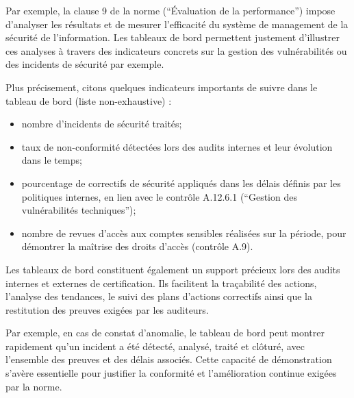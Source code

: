 Par exemple, la clause 9 de la norme (“Évaluation de la performance”) impose d'analyser les résultats et de mesurer l'efficacité du système de management de la sécurité de l'information. Les tableaux de bord permettent justement d’illustrer ces analyses à travers des indicateurs concrets sur la gestion des vulnérabilités ou des incidents de sécurité par exemple.

Plus précisement, citons quelques indicateurs importants de suivre dans le tableau de bord (liste non-exhaustive) : 
\begin{itemize}
    \item nombre d’incidents de sécurité traités;
    \item taux de non-conformité détectées lors des audits internes et leur évolution dans le temps;
    \item pourcentage de correctifs de sécurité appliqués dans les délais définis par les politiques internes, en lien avec le contrôle A.12.6.1 (“Gestion des vulnérabilités techniques”);
    \item nombre de revues d’accès aux comptes sensibles réalisées sur la période, pour démontrer la maîtrise des droits d’accès (contrôle A.9).
\end{itemize}

Les tableaux de bord constituent également un support précieux lors des audits internes et externes de certification. Ils facilitent la traçabilité des actions, l’analyse des tendances, le suivi des plans d’actions correctifs ainsi que la restitution des preuves exigées par les auditeurs.

Par exemple, en cas de constat d’anomalie, le tableau de bord peut montrer rapidement qu’un incident a été détecté, analysé, traité et clôturé, avec l’ensemble des preuves et des délais associés. Cette capacité de démonstration s’avère essentielle pour justifier la conformité et l’amélioration continue exigées par la norme.


